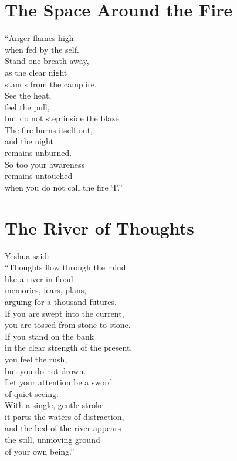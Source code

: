 \documentclass[10pt, openright]{book}
\newcommand{\sectionbreak}{\filbreak}
\begin{document}
\sectionbreak

\section{The Space Around the Fire}\label{the-space-around-the-fire}

``Anger flames high\\
when fed by the self.\\
Stand one breath away,\\
as the clear night\\
stands from the campfire.\\
See the heat,\\
feel the pull,\\
but do not step inside the blaze.\\
The fire burns itself out,\\
and the night\\
remains unburned.\\
So too your awareness\\
remains untouched\\
when you do not call the fire `I'.''

\sectionbreak

\section{The River of Thoughts}\label{the-river-of-thoughts}

Yeshua said:\\
``Thoughts flow through the mind\\
like a river in flood---\\
memories, fears, plans,\\
arguing for a thousand futures.\\
If you are swept into the current,\\
you are tossed from stone to stone.\\
If you stand on the bank\\
in the clear strength of the present,\\
you feel the rush,\\
but you do not drown.\\
Let your attention be a sword\\
of quiet seeing.\\
With a single, gentle stroke\\
it parts the waters of distraction,\\
and the bed of the river appears---\\
the still, unmoving ground\\
of your own being.''
\end{document}
